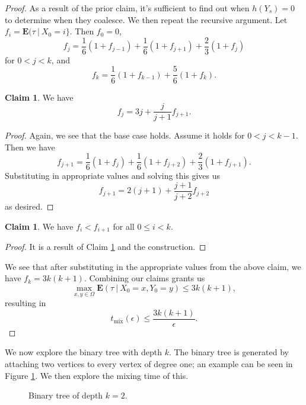 \documentclass[10pt,a4paper]{amsart}
\theoremstyle{definition}
\numberwithin{definition}{section}
\newtheorem{claim}[definition]{Claim}
\begin{document}
\begin{proof}
As a result of the prior claim, it's sufficient to find out when $h(Y_s) = 0$ to determine when they coalesce. We then repeat the recursive argument. Let $f_i = \mathbf{E}(\tau \ | \ X_0 = i\}$. Then $f_0 = 0$, 
\[f_j = \frac{1}{6}(1+f_{j-1}) + \frac{1}{6}(1+f_{j+1}) + \frac{2}{3}(1+f_j) \]
for $0 < j < k$, and 
\[f_k = \frac{1}{6}(1+f_{k-1}) + \frac{5}{6}(1+f_k). \]

\begin{claim}\label{claim:2}
We have
\[ f_j = 3j + \frac{j}{j+1}f_{j+1}. \]
\end{claim}

\begin{proof}
Again, we see that the base case holds. Assume it holds for $0 < j < k-1$. Then we have  
\[ f_{j+1} = \frac{1}{6}(1+f_j) + \frac{1}{6}(1+f_{j+2}) + \frac{2}{3}(1+f_{j+1}).\]
Substituting in appropriate values and solving this gives us
\[ f_{j+1} = 2(j+1) + \frac{j+1}{j+2}f_{j+2} \]
as desired.
\end{proof}

\begin{claim}
We have $f_i < f_{i+1}$ for all $0 \leq i < k$.
\end{claim}

\begin{proof}
It is a result of Claim \ref{claim:2} and the construction.
\end{proof}

We see that after substituting in the appropriate values from the above claim, we have $f_k = 3k(k+1).$ Combining our claims grants us 
\[ \max_{x, y \in \Omega}\mathbf{E}(\tau \ | \ X_0 =x, Y_0 =y) \leq 3k(k+1), \]
resulting in
\[ t_{\text{mix}}(\epsilon) \leq \frac{3k(k+1)}{\epsilon}.\]
\end{proof}

We now explore the binary tree with depth $k$. The binary tree is generated by attaching two vertices to every vertex of degree one; an example can be seen in Figure \ref{fig:graph6}. We then explore the mixing time of this.

\begin{figure}

\begin{center}
\end{center}
\caption{Binary tree of depth $k = 2$.}
\label{fig:graph6}
\end{figure}
\end{document}
